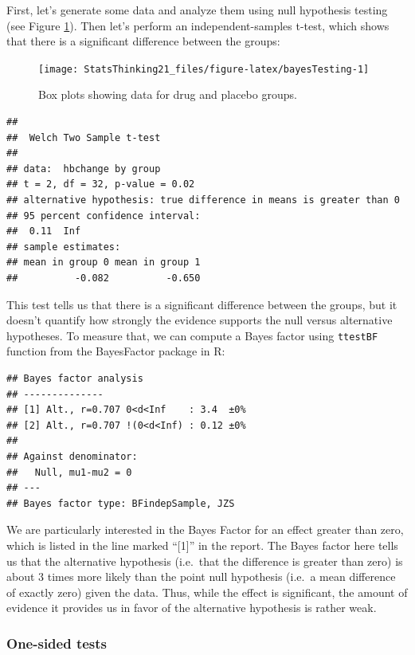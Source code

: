 \documentclass[12pt,]{book}
\theoremstyle{definition}
\theoremstyle{definition}
\theoremstyle{definition}
\theoremstyle{remark}
\begin{document}
First, let's generate some data and analyze them using null hypothesis testing (see Figure \ref{fig:bayesTesting}). Then let's perform an independent-samples t-test, which shows that there is a significant difference between the groups:

\begin{figure}
\texttt{[image: StatsThinking21\_files/figure-latex/bayesTesting-1]} \caption{Box plots showing data for drug and placebo groups.}\label{fig:bayesTesting}
\end{figure}

\begin{verbatim}
## 
##  Welch Two Sample t-test
## 
## data:  hbchange by group
## t = 2, df = 32, p-value = 0.02
## alternative hypothesis: true difference in means is greater than 0
## 95 percent confidence interval:
##  0.11  Inf
## sample estimates:
## mean in group 0 mean in group 1 
##          -0.082          -0.650
\end{verbatim}

This test tells us that there is a significant difference between the groups, but it doesn't quantify how strongly the evidence supports the null versus alternative hypotheses. To measure that, we can compute a Bayes factor using \texttt{ttestBF} function from the BayesFactor package in R:

\begin{verbatim}
## Bayes factor analysis
## --------------
## [1] Alt., r=0.707 0<d<Inf    : 3.4  ±0%
## [2] Alt., r=0.707 !(0<d<Inf) : 0.12 ±0%
## 
## Against denominator:
##   Null, mu1-mu2 = 0 
## ---
## Bayes factor type: BFindepSample, JZS
\end{verbatim}

We are particularly interested in the Bayes Factor for an effect greater than zero, which is listed in the line marked ``{[}1{]}'' in the report. The Bayes factor here tells us that the alternative hypothesis (i.e.~that the difference is greater than zero) is about 3 times more likely than the point null hypothesis (i.e.~a mean difference of exactly zero) given the data. Thus, while the effect is significant, the amount of evidence it provides us in favor of the alternative hypothesis is rather weak.

\hypertarget{one-sided-tests}{%
\subsubsection{One-sided tests}\label{one-sided-tests}}
\end{document}
